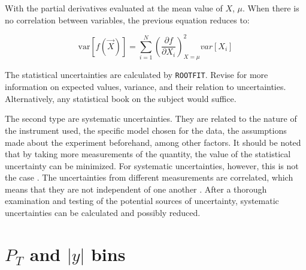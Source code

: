 With the partial derivatives evaluated at the mean value of $X$, $\mu$. When there is no correlation between variables, the previous equation reduces to:

\begin{equation}
	\label{totaluncertainty}
	\mathrm{var}[f(\vec{X})] = \sum_{i=1}^N  \left(\frac{\partial f}{\partial X_i}\right)^2_{X = \mu} var[X_i]
\end{equation}

The statistical uncertainties are calculated by \verb|ROOTFIT|. Revise \cite{vsirca2016probability} for more information on expected values, variance, and their relation to uncertainties. Alternatively, any statistical book on the subject would suffice.

The second type are systematic uncertainties. They are related to the nature of the instrument used, the specific model chosen for the data, the assumptions made about the experiment beforehand, among other factors. It should be noted that by taking more measurements of the quantity, the value of the statistical uncertainty can be minimized. For systematic uncertainties, however, this is not the case \cite{sinervo2003definition}. The uncertainties from different measurements are correlated, which means that they are not independent of one another . After a thorough examination and testing of the potential sources of uncertainty, systematic uncertainties can be calculated and possibly reduced.

\section{$P_T$ and $|y|$ bins}
